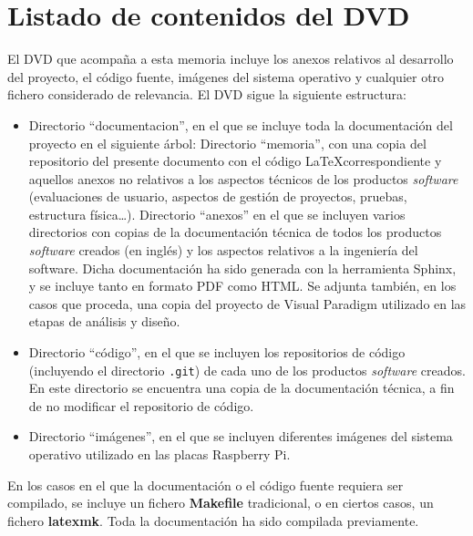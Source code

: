 \chapter{Listado de contenidos del DVD}
\label{contenidosdvd}

El DVD que acompaña a esta memoria incluye los anexos relativos al desarrollo del proyecto, el código fuente, imágenes del sistema operativo y cualquier otro fichero considerado de relevancia. El DVD sigue la siguiente estructura:

\begin{itemize}[noitemsep]

	\item Directorio ``documentacion'', en el que se incluye toda la documentación del proyecto en el siguiente árbol:
		\subitem Directorio ``memoria'', con una copia del repositorio del presente documento con el código \LaTeX correspondiente y aquellos anexos no relativos a los aspectos técnicos de los productos \textit{software} (evaluaciones de usuario, aspectos de gestión de proyectos, pruebas, estructura física\dots).
		\subitem Directorio ``anexos'' en el que se incluyen varios directorios con copias de la documentación técnica de todos los productos \textit{software} creados (en inglés) y los aspectos relativos a la ingeniería del software. Dicha documentación ha sido generada con la herramienta Sphinx, y se incluye tanto en formato PDF como HTML. Se adjunta también, en los casos que proceda, una copia del proyecto de Visual Paradigm utilizado en las etapas de análisis y diseño.
	\item Directorio ``código'', en el que se incluyen los repositorios de código (incluyendo el directorio \texttt{.git}) de cada uno de los productos \textit{software} creados. En este directorio se encuentra una copia de la documentación técnica, a fin de no modificar el repositorio de código.
	\item Directorio ``imágenes'', en el que se incluyen diferentes imágenes del sistema operativo utilizado en las placas Raspberry Pi.
\end{itemize}

En los casos en el que la documentación o el código fuente requiera ser compilado, se incluye un fichero \textbf{Makefile} tradicional, o en ciertos casos, un fichero \textbf{latexmk}. Toda la documentación ha sido compilada previamente.